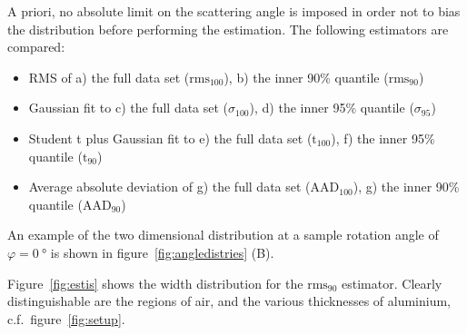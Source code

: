 \documentclass{PoS}
\newcommand{\rmshundred}{\ensuremath{\textrm{rms}_\textrm{100}}}
\newcommand{\rmsninety}{\ensuremath{\textrm{rms}_\textrm{90}}}
\newcommand{\gausshundred}{\ensuremath{\sigma_\textrm{100}}}
\newcommand{\gaussninety}{\ensuremath{\sigma_\textrm{95}}}
\newcommand{\studhundred}{\ensuremath{\textrm{t}_\textrm{100}}}
\newcommand{\studninety}{\ensuremath{\textrm{t}_\textrm{90}}}
\newcommand{\aadhundred}{\ensuremath{\textrm{AAD}_\textrm{100}}}
\newcommand{\aadninety}{\ensuremath{\textrm{AAD}_\textrm{90}}}
\begin{document}
A priori, no absolute limit on the scattering angle is imposed in order not to bias the distribution before performing the estimation. 
The following estimators are compared:
\begin{itemize}\itemsep0pt
 \item RMS of a) the full data set ($\rmshundred$), b) the inner 90\% quantile ($\rmsninety$)
 \item Gaussian fit to c) the full data set ($\gausshundred$), d) the inner 95\% quantile ($\gaussninety$)
 \item Student t plus Gaussian fit to e) the full data set ($\studhundred$), f) the inner 95\% quantile ($\studninety$)
 \item Average absolute deviation of g) the full data set ($\aadhundred$), g) the inner 90\% quantile ($\aadninety$)
 
\end{itemize}

An example of the two dimensional distribution at a sample rotation angle of $\varphi = \SI{0}{\degree}$ is shown in figure~\ref{fig:angledistries} (B). 

%

Figure~\ref{fig:estis} shows the width distribution for the $\rmsninety$ estimator. 
Clearly distinguishable are the regions of air, and the various thicknesses of aluminium, c.f.\ figure~\ref{fig:setup}. 
\end{document}
